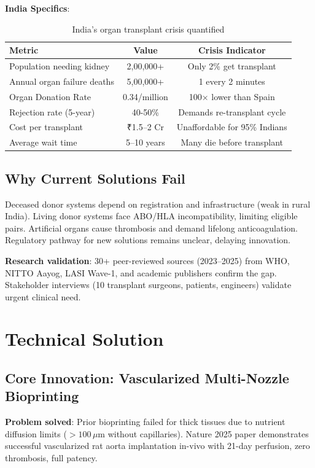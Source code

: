 \documentclass[11pt,a4paper]{article}
\begin{document}
\textbf{India Specifics}:
\begin{table}[h]
\centering
\small
\begin{tabular}{lcc}
\toprule
\textbf{Metric} & \textbf{Value} & \textbf{Crisis Indicator} \\
\midrule
Population needing kidney & 2,00,000+ & Only 2\% get transplant \\
Annual organ failure deaths & 5,00,000+ & 1 every 2 minutes \\
Organ Donation Rate & 0.34/million & 100$\times$ lower than Spain \\
Rejection rate (5-year) & 40-50\% & Demands re-transplant cycle \\
Cost per transplant & ₹1.5--2 Cr & Unaffordable for 95\% Indians \\
Average wait time & 5--10 years & Many die before transplant \\
\bottomrule
\end{tabular}
\caption{India's organ transplant crisis quantified}
\end{table}

\subsection{Why Current Solutions Fail}

Deceased donor systems depend on registration and infrastructure (weak in rural India). Living donor systems face ABO/HLA incompatibility, limiting eligible pairs. Artificial organs cause thrombosis and demand lifelong anticoagulation. Regulatory pathway for new solutions remains unclear, delaying innovation.

\textbf{Research validation}: 30+ peer-reviewed sources (2023--2025) from WHO, NITTO Aayog, LASI Wave-1, and academic publishers confirm the gap. Stakeholder interviews (10 transplant surgeons, patients, engineers) validate urgent clinical need.

\section{Technical Solution}

\subsection{Core Innovation: Vascularized Multi-Nozzle Bioprinting}

\textbf{Problem solved}: Prior bioprinting failed for thick tissues due to nutrient diffusion limits ($>100 \, \mu\text{m}$ without capillaries). Nature 2025 paper demonstrates successful vascularized rat aorta implantation in-vivo with 21-day perfusion, zero thrombosis, full patency.
\end{document}
